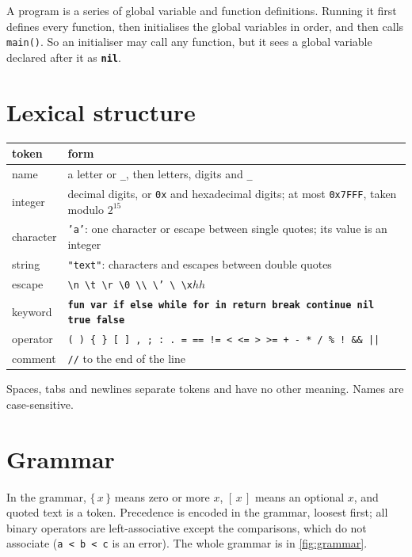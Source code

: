 \documentclass[11pt,a4paper]{article}
\newcommand{\kw}[1]{\textbf{\texttt{#1}}}
\newcommand{\hx}[1]{\texttt{0x#1}}
\begin{document}
A program is a series of global variable and function definitions. Running
it first defines every function, then initialises the global variables in
order, and then calls \texttt{main()}. So an initialiser may call any
function, but it sees a global variable declared after it as \kw{nil}.

\section{Lexical structure}

\begin{center}
\small
\begin{tabularx}{\linewidth}{@{}l X@{}}
\toprule
token & form\\
\midrule
name & a letter or \texttt{\_}, then letters, digits and \texttt{\_}\\
integer & decimal digits, or \texttt{0x} and hexadecimal digits; at most \hx{7FFF}, taken modulo $2^{15}$\\
character & \texttt{'a'}: one character or escape between single quotes; its value is an integer\\
string & \texttt{"text"}: characters and escapes between double quotes\\
escape & \texttt{\textbackslash n \textbackslash t \textbackslash r \textbackslash 0 \textbackslash\textbackslash{} \textbackslash' \textbackslash\textquotedbl{} \textbackslash x}$hh$\\
keyword & \kw{fun var if else while for in return break continue nil true false}\\
operator & \texttt{( ) \{ \} [ ] , ; : .\ = == != < <= > >= + - * / \% ! \&\& ||}\\
comment & \texttt{//} to the end of the line\\
\bottomrule
\end{tabularx}
\end{center}
Spaces, tabs and newlines separate tokens and have no other meaning. Names
are case-sensitive.

\section{Grammar}

In the grammar, $\{\,x\,\}$ means zero or more $x$, $[\,x\,]$ means an
optional $x$, and quoted text is a token. Precedence is encoded in the
grammar, loosest first; all binary operators are left-associative except the
comparisons, which do not associate (\verb|a < b < c| is an error). The
whole grammar is in \cref{fig:grammar}.
\end{document}
